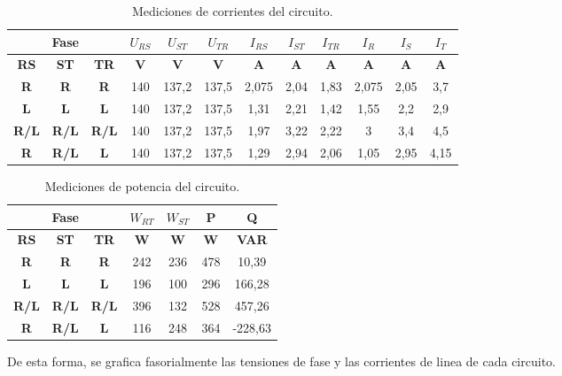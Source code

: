 \documentclass[a4paper]{article}
\begin{document}
\begin{table}[H]
\centering
\begin{tabular}{|c|c|c|c|c|c|c|c|c|c|c|c|}
\hline
\multicolumn{3}{|c|}{\textbf{Fase}} & \textbf{$U_{RS}$} & \textbf{$U_{ST}$} & \textbf{$U_{TR}$} & \textbf{$I_{RS}$} & \textbf{$I_{ST}$} & \textbf{$I_{TR}$} & \textbf{$I_{R}$} & \textbf{$I_{S}$} & \textbf{$I_{T}$} \\ \hline
\textbf{RS} & \textbf{ST} & \textbf{TR} & \textbf{V} & \textbf{V} & \textbf{V} & \textbf{A} & \textbf{A} & \textbf{A} & \textbf{A} & \textbf{A} & \textbf{A} \\ \hline
\textbf{R} & \textbf{R} & \textbf{R} & 140 & 137,2 & 137,5 & 2,075 & 2,04 & 1,83 & 2,075 & 2,05 & 3,7 \\ \hline
\textbf{L} & \textbf{L} & \textbf{L} & 140 & 137,2 & 137,5 & 1,31 & 2,21 & 1,42 & 1,55 & 2,2 & 2,9 \\ \hline
\textbf{R/L} & \textbf{R/L} & \textbf{R/L} & 140 & 137,2 & 137,5 & 1,97 & 3,22 & 2,22 & 3 & 3,4 & 4,5 \\ \hline
\textbf{R} & \textbf{R/L} & \textbf{L} & 140 & 137,2 & 137,5 & 1,29 & 2,94 & 2,06 & 1,05 & 2,95 & 4,15 \\ \hline
\end{tabular}
\label{tabla:1}
\caption{Mediciones de corrientes del circuito.}
\end{table}

\begin{table}[H]
\centering
\begin{tabular}{|c|c|c|c|c|c|c|}
\hline
\multicolumn{3}{|c|}{\textbf{Fase}} & \textbf{$W_{RT}$} & \textbf{$W_{ST}$} & \textbf{P} & \textbf{Q} \\ \hline
\textbf{RS} & \textbf{ST} & \textbf{TR} & \textbf{W} & \textbf{W} & \textbf{W} & \textbf{VAR} \\ \hline
\textbf{R} & \textbf{R} & \textbf{R} & 242 & 236 & 478 & 10,39 \\ \hline
\textbf{L} & \textbf{L} & \textbf{L} & 196 & 100 & 296 & 166,28 \\ \hline
\textbf{R/L} & \textbf{R/L} & \textbf{R/L} & 396 & 132 & 528 & 457,26 \\ \hline
\textbf{R} & \textbf{R/L} & \textbf{L} & 116 & 248 & 364 & -228,63 \\ \hline
\end{tabular}
\label{tabla:2}
\caption{Mediciones de potencia del circuito.}
\end{table}

De esta forma, se grafica fasorialmente las tensiones de fase y las corrientes de linea de cada circuito.
\end{document}
